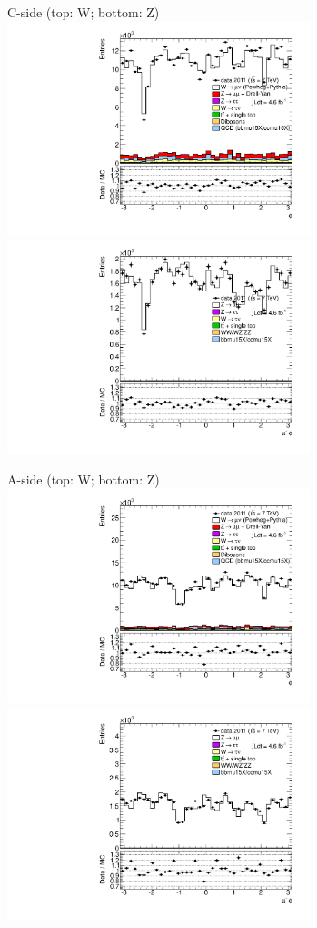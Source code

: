 {

\colb[T]

C-side (top: W; bottom: Z)
\centering
\includegraphics[width=0.66\textwidth]{dates/20130306/figures/etaphi/W_6_C_stack_l_phi_NEG} \\
\includegraphics[width=0.66\textwidth]{dates/20130306/figures/etaphi/Z_6_C_stack_lN_phi_ALL.pdf}

A-side (top: W; bottom: Z)
\centering
\includegraphics[width=0.66\textwidth]{dates/20130306/figures/etaphi/W_6_A_stack_l_phi_NEG} \\
\includegraphics[width=0.66\textwidth]{dates/20130306/figures/etaphi/Z_6_A_stack_lN_phi_ALL.pdf} 

\cole
}


